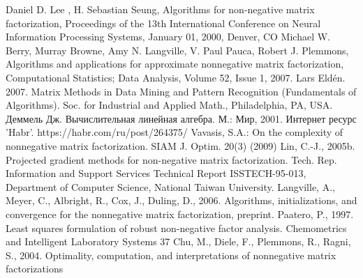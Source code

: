 \newpage
{}

\begin{thebibliography}{9}
   Daniel D. Lee , H. Sebastian Seung, Algorithms for non-negative matrix factorization, Proceedings of the 13th International Conference on Neural Information Processing Systems, January 01, 2000, Denver, CO
   Michael W. Berry, Murray Browne, Amy N. Langville, V. Paul Pauca, Robert J. Plemmons, Algorithms and applications for approximate nonnegative matrix factorization, Computational Statistics; Data Analysis, Volume 52, Issue 1, 2007.
   Lars Eldén. 2007. Matrix Methods in Data Mining and Pattern Recognition (Fundamentals of Algorithms). Soc. for Industrial and Applied Math., Philadelphia, PA, USA.
   Деммель Дж. Вычислительная линейная алгебра. М.: Мир, 2001.
   Интернет ресурс 'Habr'. https://habr.com/ru/post/264375/
   Vavasis, S.A.: On the complexity of nonnegative matrix factorization. SIAM J. Optim. 20(3) (2009)
   Lin, C.-J., 2005b. Projected gradient methods for non-negative matrix factorization. Tech. Rep. Information and Support Services Technical Report ISSTECH-95-013, Department of Computer Science, National Taiwan University.
   Langville, A., Meyer, C., Albright, R., Cox, J., Duling, D., 2006. Algorithms, initializations, and convergence for the nonnegative matrix factorization, preprint.
   Paatero, P., 1997. Least squares formulation of robust non-negative factor analysis. Chemometrics and Intelligent Laboratory Systems 37
   Chu, M., Diele, F., Plemmons, R., Ragni, S., 2004. Optimality, computation, and interpretations of nonnegative matrix factorizations
\end{thebibliography}

